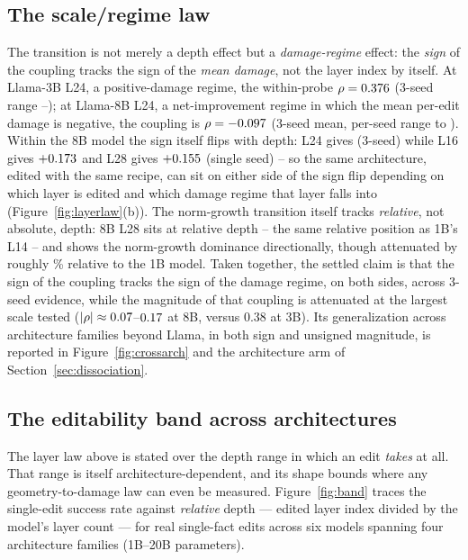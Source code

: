 \subsection{The scale/regime law}
The transition is not merely a depth effect but a \emph{damage-regime}
effect: the \emph{sign} of the coupling tracks the sign of the
\emph{mean damage}, not the layer index by itself. At Llama-3B L24, a
positive-damage regime, the within-probe $\rho = 0.376{}$ (3-seed
range \regimeThreeBLo{}--\regimeThreeBHi{}); at Llama-8B L24, a
net-improvement regime in which the mean per-edit damage is negative, the
coupling is $\rho = -0.097{}$ (3-seed mean, per-seed range
\regimeEightBHi{} to \regimeEightBLo{}). Within the 8B model the sign itself
flips with depth: L24 gives \regimeEightB{} (3-seed) while L16 gives
$+0.173{}$ and L28 gives $+0.155{}$
(single seed) -- so the same architecture, edited with the same recipe, can
sit on either side of the sign flip depending on which layer is edited and
which damage regime that layer falls into (Figure~\ref{fig:layerlaw}(b)).
The norm-growth transition itself tracks \emph{relative}, not absolute,
depth: 8B L28 sits at \relDepthEightBLtwentyeight{} relative depth -- the
same relative position as 1B's L14 -- and shows the norm-growth dominance
directionally, though attenuated by roughly \ngAttenPct\% relative to the 1B
model. Taken together, the settled claim is that the sign of the
coupling tracks the sign of the damage regime, on both sides, across 3-seed
evidence, while the magnitude of that coupling is attenuated at the largest
scale tested ($|\rho|\approx0.07{}$--$0.17{}$ at 8B,
versus $0.38$ at 3B). Its generalization across
architecture families beyond Llama, in both sign and unsigned magnitude, is
reported in Figure~\ref{fig:crossarch} and the architecture arm of
Section~\ref{sec:dissociation}.





\subsection{The editability band across architectures}
The layer law above is stated over the depth range in which an edit
\emph{takes} at all. That range is itself architecture-dependent, and its
shape bounds where any geometry-to-damage law can even be measured.
Figure~\ref{fig:band} traces the single-edit success rate against
\emph{relative} depth --- edited layer index divided by the model's layer
count --- for real single-fact edits across six models spanning four
architecture families (1B--20B parameters).


